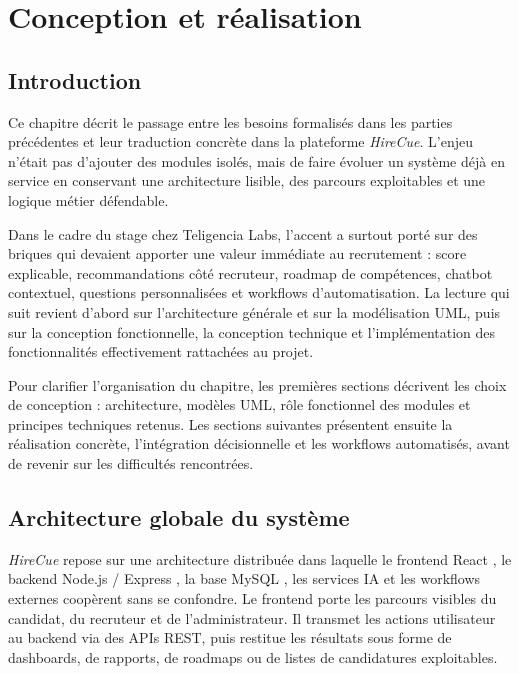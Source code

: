 \chapter{Conception et réalisation}

\section{Introduction}

Ce chapitre décrit le passage entre les besoins formalisés dans les parties précédentes et leur traduction concrète dans la plateforme \textit{HireCue}. L'enjeu n'était pas d'ajouter des modules isolés, mais de faire évoluer un système déjà en service en conservant une architecture lisible, des parcours exploitables et une logique métier défendable.

Dans le cadre du stage chez Teligencia Labs, l'accent a surtout porté sur des briques qui devaient apporter une valeur immédiate au recrutement : score explicable, recommandations côté recruteur, roadmap de compétences, chatbot contextuel, questions personnalisées et workflows d'automatisation. La lecture qui suit revient d'abord sur l'architecture générale et sur la modélisation UML, puis sur la conception fonctionnelle, la conception technique et l'implémentation des fonctionnalités effectivement rattachées au projet.

Pour clarifier l'organisation du chapitre, les premières sections décrivent les choix de conception : architecture, modèles UML, rôle fonctionnel des modules et principes techniques retenus. Les sections suivantes présentent ensuite la réalisation concrète, l'intégration décisionnelle et les workflows automatisés, avant de revenir sur les difficultés rencontrées.

\section{Architecture globale du système}

\textit{HireCue} repose sur une architecture distribuée dans laquelle le frontend React \cite{react_docs}, le backend Node.js / Express \cite{node_docs}, la base MySQL \cite{mysql_docs}, les services IA et les workflows externes coopèrent sans se confondre. Le frontend porte les parcours visibles du candidat, du recruteur et de l'administrateur. Il transmet les actions utilisateur au backend via des APIs REST, puis restitue les résultats sous forme de dashboards, de rapports, de roadmaps ou de listes de candidatures exploitables.

